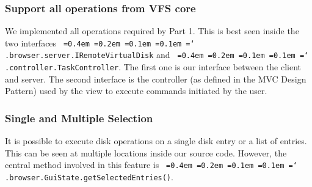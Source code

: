 \documentclass[a4paper,12pt]{article}
\newcommand*\justify{%
  \fontdimen2\font=0.4em%
  \fontdimen3\font=0.2em%
  \fontdimen4\font=0.1em%
  \fontdimen7\font=0.1em%
  \hyphenchar\font=`\-%
}
\newcommand{\mono}[1]{\texttt{\justify #1}}
\begin{document}
\subsubsection{Support all operations from VFS core}
We implemented all operations required by Part 1. This is best seen inside the two interfaces \mono{.browser.server.IRemoteVirtualDisk} and \mono{.controller.TaskController}. The first one is our interface between the client and server. The second interface is the controller (as defined in the MVC Design Pattern) used by the view to execute commands initiated by the user.

\subsubsection{Single and Multiple Selection}
It is possible to execute disk operations on a single disk entry or a list of entries. This can be seen at multiple locations inside our source code. However, the central method involved in this feature is \mono{.browser.GuiState.getSelectedEntries()}.
\end{document}
